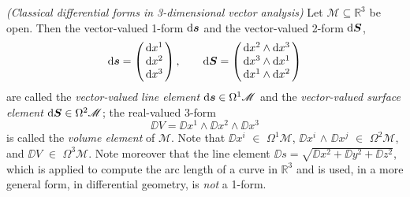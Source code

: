 \begin{beispiel}
	\emph{(Classical differential forms in 3-dimensional vector analysis)}
	\cite[169]{Jaenich-1992}
	Let $\mathscr{M} \subseteq \mathbb{R}^3$ be open. Then the vector-valued 1-form $\mathrm{d} \mbox{$\boldsymbol{s}$}$ and the vector-valued 2-form $\mathrm{d} \mbox{$\boldsymbol{S}$}$,
	\begin{equation}
		\DD \fett{s}
		= \left(\begin{array}{@{\,}c@{\,}}
			\DD x^1 \\ \DD x^2 \\ \DD x^3
		\end{array}
		\right),
		\qquad
		\DD \fett{S}
		= \left(\begin{array}{@{\,}c@{\,}}
			\DD x^2 \wedge \DD x^3 \\ \DD x^3 \wedge \DD x^1 \\ \DD x^1 \wedge \DD x^2
		\end{array}
		\right)
	\end{equation}
	are called the \emph{vector-valued line element} $\mathrm{d} \mbox{$\boldsymbol{s}$} \in \Omega^1 \mathscr{M}$ and the \emph{vector-valued surface element} $\mathrm{d} \mbox{$\boldsymbol{S}$} \in \Omega^2 \mathscr{M}$; the real-valued 3-form
	\begin{equation}
		\DD V = \DD x^1 \wedge \DD x^2 \wedge \DD x^3
		\label{eq:volume-element}
	\end{equation}
	is called the \emph{volume element} of $\mathscr{M}$. Note that 
	$\DD x^i$ $\in$ $\Omega^1 \mathscr{M}$, $\DD x^i$ $\wedge$ $\DD x^j$ $\in$ $\Omega^2 \mathscr{M}$, and $\DD V$ $\in$ $\Omega^3 \mathscr{M}$.
	Note moreover that the line element $\DD s = \sqrt{\DD x^2 + \DD y^2 + \DD z^2}$, which is applied to compute the arc length of a curve in $\mathbb{R}^3$ and is used, in a more general form, in differential geometry, is \emph{not} a 1-form. \cite[68]{Jaenich-1992}  
\end{beispiel}


